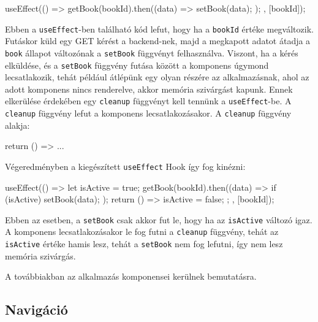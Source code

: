 \begin{java}
useEffect(() => {
  getBook(bookId).then((data) => {
    setBook(data);
  });
}, [bookId]);
\end{java}
Ebben a \texttt{useEffect}-ben található kód lefut, hogy ha a \texttt{bookId} értéke megváltozik. Futáskor küld egy GET kérést a backend-nek, majd a megkapott adatot átadja a \texttt{book} állapot változónak a \texttt{setBook} függvényt felhasználva. Viszont, ha a kérés elküldése, és a \texttt{setBook} függvény futása között a komponens úgymond lecsatlakozik, tehát például átlépünk egy olyan részére az alkalmazásnak, ahol az adott komponens nincs renderelve, akkor memória szivárgást kapunk. Ennek elkerülése érdekében egy \texttt{cleanup} függvényt kell tennünk a \texttt{useEffect}-be. A \texttt{cleanup} függvény lefut a komponens lecsatlakozásakor. A \texttt{cleanup} függvény alakja:
\begin{java}
return () => {...}
\end{java}
Végeredményben a kiegészített \texttt{useEffect} Hook így fog kinézni:
\begin{java}
useEffect(() => {
  let isActive = true;
  getBook(bookId).then((data) => {
    if (isActive) {
      setBook(data);
    }
  });
  return () => {
    isActive = false;
  };
}, [bookId]);
\end{java}
Ebben az esetben, a \texttt{setBook} csak akkor fut le, hogy ha az \texttt{isActive} változó igaz. A komponens lecsatlakozásakor le fog futni a \texttt{cleanup} függvény, tehát az \texttt{isActive} értéke hamis lesz, tehát a \texttt{setBook} nem fog lefutni, így nem lesz memória szivárgás.

A továbbiakban az alkalmazás komponensei kerülnek bemutatásra.

\subsection{Navigáció}

